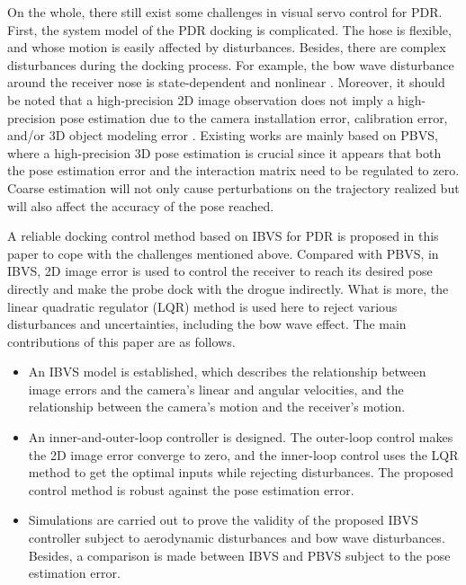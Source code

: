 On the whole, there still exist some challenges in visual servo control for PDR. First, the system model of the PDR docking is complicated. The hose is flexible, and whose motion is easily affected by disturbances. Besides, there are complex disturbances during the docking process. For example, the bow wave disturbance around the receiver nose is state-dependent and nonlinear \cite{DAI2016448,7738351}. Moreover, it should be noted that a high-precision 2D image observation does not imply a high-precision pose estimation due to the camera installation error, calibration error, and/or 3D object modeling error \cite{garcia2021real}. Existing works \cite{duan2020bionic,valasek2017fault,dai2018terminal,ren2019reliable} are mainly based on PBVS, where a high-precision 3D pose estimation is crucial since it appears that both the pose estimation error and the interaction matrix need to be regulated to zero. Coarse estimation will not only cause perturbations on the trajectory realized but will also affect the accuracy of the pose reached. 

A reliable docking control method based on IBVS for PDR is proposed in this paper to cope with the challenges mentioned above. Compared with PBVS, in IBVS, 2D image error is used to control the receiver to reach its desired pose directly and make the probe dock with the drogue  indirectly. What is more, the linear quadratic regulator (LQR) method is used here to reject various disturbances and uncertainties, including the bow wave effect. 
The main contributions of this paper are as follows.

\begin{itemize}
	\item An IBVS model is established, which describes the relationship between image errors and the camera's linear and angular velocities, and the relationship between the camera's motion and the receiver's motion.
	\item An inner-and-outer-loop controller is designed. The outer-loop control makes the 2D image error converge to zero, and the inner-loop control uses the LQR method to get the optimal inputs while rejecting disturbances. The proposed control method is robust against the pose estimation error.
	\item  Simulations are carried out to prove the validity of the proposed IBVS controller subject to aerodynamic disturbances and bow wave disturbances. Besides, a comparison is made between IBVS and PBVS subject to the pose estimation error.
\end{itemize}


